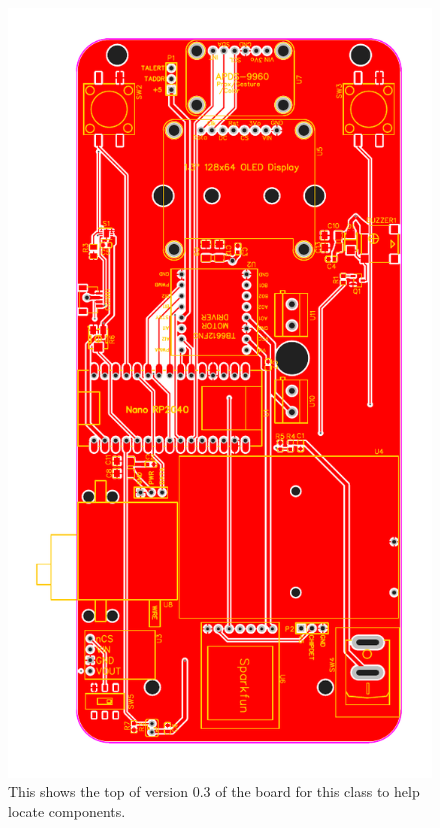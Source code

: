 \begin{figure}[!htb]
	\centering
	\includegraphics[scale=0.8]{arduinoStart/PCB_NanoConnectRP2040test1v0.3} %
	\caption{This shows the top of version 0.3 of the board for this class to help locate components.}
	\label{fig:boardTop}
\end{figure} 

